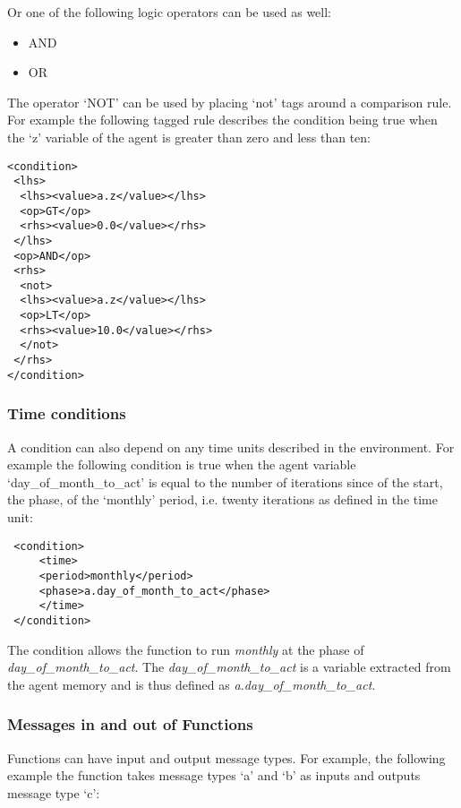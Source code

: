 Or one of the following logic operators can be used as well:

\begin{itemize}
\item AND
\item OR
\end{itemize}

The operator `NOT' can be used by placing `not' tags around a comparison rule.
For example the following tagged rule describes the condition being true when
the `z' variable of the agent is greater than zero and less than ten:

\begin{mylisting}
\begin{verbatim}
<condition>
 <lhs>
  <lhs><value>a.z</value></lhs>
  <op>GT</op>
  <rhs><value>0.0</value></rhs>
 </lhs>
 <op>AND</op>
 <rhs>
  <not>
  <lhs><value>a.z</value></lhs>
  <op>LT</op>
  <rhs><value>10.0</value></rhs>
  </not>
 </rhs>
</condition>
\end{verbatim}
\end{mylisting}

\subsubsection{Time conditions}

A condition can also depend on any time units described in the environment. For
example the following condition is true when the agent variable
`day\_of\_month\_to\_act' is equal to the number of iterations since of the
start, the phase, of the `monthly' period, i.e. twenty iterations as defined in
the time unit:

\begin{mylisting}
\begin{verbatim}
 <condition>
     <time>
     <period>monthly</period>
     <phase>a.day_of_month_to_act</phase>
     </time>
 </condition>
\end{verbatim}
\end{mylisting}

 The condition allows the function to run \emph{monthly} at the phase
 of \emph{day\_of\_month\_to\_act}. The
 \emph{day\_of\_month\_to\_act} is a variable extracted from the
 agent memory and is thus defined as
 \emph{a.day\_of\_month\_to\_act}.

%
%
\subsubsection{Messages in and out of Functions}
Functions can have input and output message types. For example, the following
example the function takes message types `a' and `b' as inputs and outputs
message type `c':

